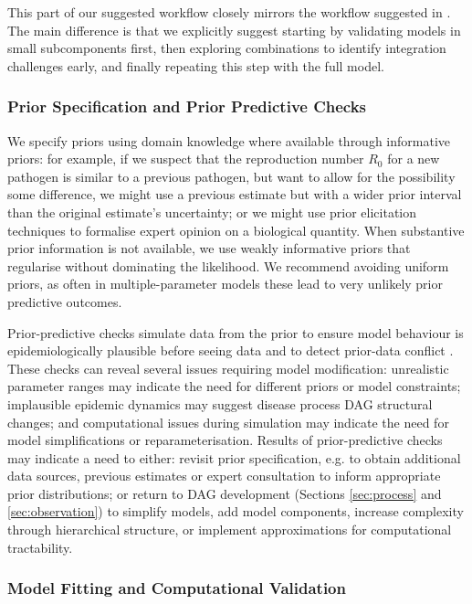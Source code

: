 \documentclass{article}
\begin{document}
This part of our suggested workflow closely mirrors the workflow suggested in \citet{gelman2020bayesian}.
The main difference is that we explicitly suggest starting by validating models in small subcomponents first, then exploring combinations to identify integration challenges early, and finally repeating this step with the full model.

\subsubsection{Prior Specification and Prior Predictive Checks}

We specify priors using domain knowledge where available through informative priors: for example, if we suspect that the reproduction number $R_0$ for a new pathogen is similar to a previous pathogen, but want to allow for the possibility some difference, we might use a previous estimate but with a wider prior interval than the original estimate's uncertainty; or we might use prior elicitation techniques \citep{o2006uncertain} to formalise expert opinion on a biological quantity. When substantive prior information is not available, we use weakly informative priors that regularise without dominating the likelihood. We recommend avoiding uniform priors, as often in multiple-parameter models these lead to very unlikely prior predictive outcomes.

Prior-predictive checks simulate data from the prior to ensure model behaviour is epidemiologically plausible before seeing data and to detect prior-data conflict \citep{Box1980,yang2025detecting}.
These checks can reveal several issues requiring model modification: unrealistic parameter ranges may indicate the need for different priors or model constraints; implausible epidemic dynamics may suggest disease process \ac{DAG} structural changes; and computational issues during simulation may indicate the need for model simplifications or reparameterisation.
Results of prior-predictive checks may indicate a need to either: revisit prior specification, e.g. to obtain additional data sources, previous estimates or expert consultation to inform appropriate prior distributions; or return to \ac{DAG} development (Sections \ref{sec:process} and \ref{sec:observation}) to simplify models, add model components, increase complexity through hierarchical structure, or implement approximations for computational tractability.

\subsubsection{Model Fitting and Computational Validation}
\end{document}
